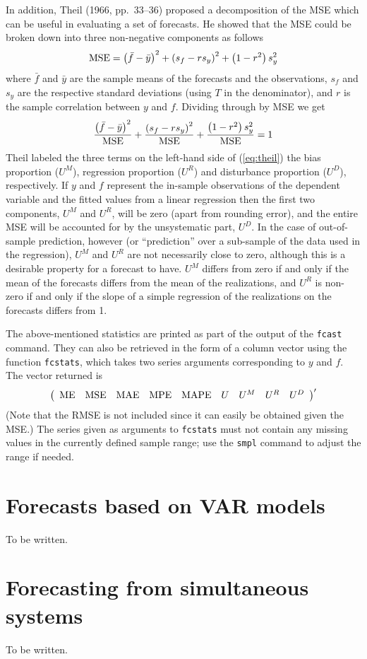 In addition, Theil (1966, pp.\ 33--36) proposed a decomposition of the
MSE which can be useful in evaluating a set of forecasts.  He showed
that the MSE could be broken down into three non-negative components
as follows
%
\[
{\rm MSE} = \left(\bar{f}-\bar{y}\right)^2 + 
  \left(s_f - rs_y\right)^2 + 
  \left(1-r^2\right) s_y^2
\]
%
where $\bar{f}$ and $\bar{y}$ are the sample means of the forecasts
and the observations, $s_f$ and $s_y$ are the respective standard
deviations (using $T$ in the denominator), and $r$ is the sample
correlation between $y$ and $f$.  Dividing through by MSE we get
%
\begin{equation}
\label{eq:theil}
\frac{\left(\bar{f}-\bar{y}\right)^2}{\rm MSE} +
\frac{\left(s_f - rs_y\right)^2}{\rm MSE} + 
\frac{\left(1-r^2\right) s_y^2}{\rm MSE} = 1
\end{equation}
%
Theil labeled the three terms on the left-hand side of
(\ref{eq:theil}) the bias proportion ($U^M$), regression proportion
($U^R$) and disturbance proportion ($U^D$), respectively. If $y$ and
$f$ represent the in-sample observations of the dependent variable and
the fitted values from a linear regression then the first two
components, $U^M$ and $U^R$, will be zero (apart from rounding error),
and the entire MSE will be accounted for by the unsystematic part,
$U^D$.  In the case of out-of-sample prediction, however (or
``prediction'' over a sub-sample of the data used in the regression),
$U^M$ and $U^R$ are not necessarily close to zero, although this is a
desirable property for a forecast to have. $U^M$ differs from zero if
and only if the mean of the forecasts differs from the mean of the
realizations, and $U^R$ is non-zero if and only if the slope of a
simple regression of the realizations on the forecasts differs from
1.

The above-mentioned statistics are printed as part of the output of
the \texttt{fcast} command.  They can also be retrieved in the form of
a column vector using the function \texttt{fcstats}, which takes two
series arguments corresponding to $y$ and $f$.  The vector returned is
%
\[
\left(
\begin{array}{lllllllll}
{\rm ME} & {\rm MSE} & {\rm MAE} & {\rm MPE} & {\rm MAPE} &
U & U^M & U^R & U^D
\end{array}
\right)'
\]
%
(Note that the RMSE is not included since it can easily be obtained
given the MSE.)  The series given as arguments to \texttt{fcstats}
must not contain any missing values in the currently defined sample
range; use the \texttt{smpl} command to adjust the range if needed.

\section{Forecasts based on VAR models}
\label{sec:fcast-VAR}

To be written.

\section{Forecasting from simultaneous systems}
\label{sec:fcast-system}

To be written.

    
